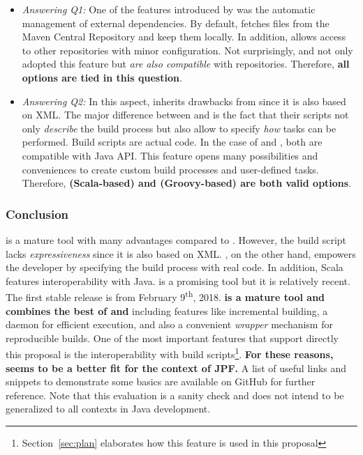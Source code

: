 \documentclass{article}
\begin{document}
\begin{itemize}
\item \emph{Answering Q1:}
One of the features introduced by \maven{} was the automatic management of
external dependencies.
By default, \maven{} fetches \jar{} files from the Maven Central
Repository\cite{page:mvncentral} and keep them locally.
In addition, \maven{} allows access to other repositories\cite{page:mvnrepo}
with minor configuration.
Not surprisingly, \gradle{} and \sbt{} not only adopted this feature but
\emph{are also compatible} with \maven{} repositories.
Therefore, \textbf{all options are tied in this question}.

\item \emph{Answering Q2:}
In this aspect, \maven{} inherits drawbacks from \ant{} since it is also based
on XML.
The major difference between \gradle{} and \sbt{} is the fact that their scripts not
only \emph{describe} the build process but also allow to specify \emph{how}
tasks can be performed.
Build scripts are actual code.
In the case of \sbt{} and \gradle{}, both are compatible with Java API.
This feature opens many possibilities and conveniences to create custom build
processes and user-defined tasks.
Therefore, \textbf{\sbt{} (Scala-based) and \gradle{} (Groovy-based) are both
valid options}.

\end{itemize}

\subsubsection*{Conclusion}
\maven{} is a mature tool with many advantages compared to \ant{}.
However, the build script lacks \emph{expressiveness} since it is also based on
XML.
\sbt{}, on the other hand, empowers the developer by specifying the build
process with real code.
In addition, Scala features interoperability with Java.
\sbt{} is a promising tool but it is relatively recent.
The first stable release is from February 9\textsuperscript{th},
2018\cite{page:sbt-release}.
\textbf{\gradle{} is a mature tool and combines the best of \maven{} and \sbt{}}
including features like incremental building, a daemon for efficient
execution\cite{page:gradle-daemon}, and also a convenient \emph{wrapper}
mechanism\cite{page:gradle-wrapper} for reproducible builds.
One of the most important \gradle{} features that support directly this
proposal is the interoperability with \ant{} build
scripts\cite{page:gradle-ant-support}\footnote{Section~\ref{sec:plan}
elaborates how this feature is used in this proposal}.
\textbf{For these reasons, \gradle{} seems to be a better fit for the context
of JPF.}
A list of useful links and snippets to demonstrate some \gradle{} basics are
available on GitHub\cite{page:gradle-labs} for further reference. 
Note that this evaluation is a sanity check and does not intend to be
generalized to all contexts in Java development.

\clearpage


\end{document}
